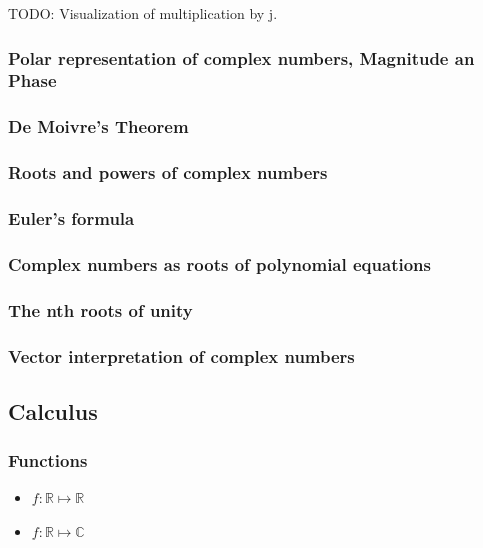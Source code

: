 \documentclass{article}
\begin{document}
TODO: Visualization of multiplication by j.

\subsubsection{Polar representation of complex numbers, Magnitude an Phase}

\subsubsection{De Moivre's Theorem}

\subsubsection{Roots and powers of complex numbers}

\subsubsection{Euler's formula}

\subsubsection{Complex numbers as roots of polynomial equations}

\subsubsection{The nth roots of unity}

\subsubsection{Vector interpretation of complex numbers}

\subsection{Calculus}

\subsubsection{Functions}

\begin{itemize}
\item $f:\mathbb{R}\mapsto\mathbb{R}$
\item $f:\mathbb{R}\mapsto\mathbb{C}$
\end{itemize}
\end{document}

